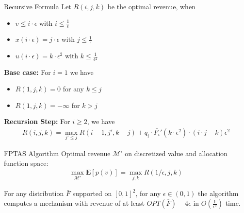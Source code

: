 \documentclass{beamer}
\begin{document}
\begin{frame}{Recursive Formula}
  Let $R(i,j,k)$ be the optimal revenue, when
  \begin{itemize}
    \item $v \leq i \cdot \epsilon$ with $i \leq \frac{1}{\epsilon}$
    \item $x(i \cdot \epsilon) = j \cdot \epsilon$ with $j \leq \frac{1}{\epsilon}$
    \item $u(i \cdot \epsilon) = k \cdot \epsilon^2$ with $k \leq \frac{1}{\epsilon^2}$
  \end{itemize}

  \textbf{Base case:}
  For $i = 1$ we have
  \begin{itemize}
    \item $R(1,j,k) = 0$ for any $k \leq j$
    \item $R(1,j,k) = -\infty$ for $k > j$
  \end{itemize}

  \textbf{Recursion Step:}
  For $i \geq 2$, we have
  \begin{align*}
    R(i,j,k) = \max_{j' \leq j} R(i-1, j', k-j) + q_i \cdot \bar{F_i}'(k \cdot \epsilon^2)\cdot (i \cdot j - k)\epsilon^2
  \end{align*}
\end{frame}

\begin{frame}{FPTAS Algorithm}
  Optimal revenue $\mathcal{M}'$ on discretized value and allocation function space:
  \begin{align*}
    \max_{\mathcal{M}'} \mathbf{E}\left[p(v)\right] = \max_{j,k} R(1/\epsilon, j, k)
  \end{align*}

  \begin{theorem}
    For any distribution $\bar{F}$ supported on $[0,1]^2$, for any $\epsilon \in (0,1)$ the algorithm computes a mechanism with revenue of at least $OPT(\bar{F}) - 4\epsilon$ in $O(\frac{1}{\epsilon^5})$ time.
  \end{theorem}
\end{frame}
\end{document}
